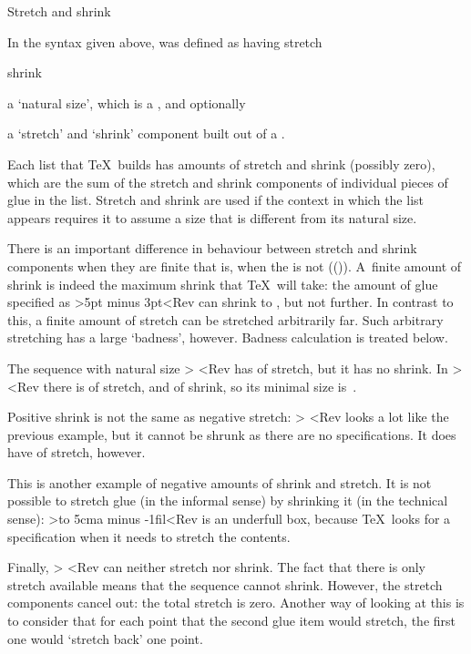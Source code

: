 \spoint Stretch and shrink

In the syntax given above,  was defined as having
\term stretch\par\term shrink\par
\itemlist\item a `natural size', which is a , and optionally
\item a `stretch' and `shrink' component built out of a .
\itemliststop

Each list that \TeX\ builds has amounts of stretch and shrink
(possibly zero),
which are the sum of the
stretch and shrink components of individual pieces of glue in the list. 
Stretch and shrink are used if the context in which the list
appears requires it to assume a size that is different from
its natural size.

There is an important difference in behaviour between stretch
and shrink components when they are finite \ldash that is,
when the  is not (()). 
A~finite amount of shrink is indeed the maximum shrink
that \TeX\ will take: the amount of glue specified
as \Ver>5pt minus 3pt<Rev can shrink to \n{2pt}, but not further.
In contrast to this, a finite amount of stretch 
can be stretched arbitrarily far. 
Such arbitrary stretching
has a large `badness', however.
Badness calculation is treated below.

\examples
The sequence with natural size \n{20pt}
\Ver> <Rev
has \n{5pt} of stretch, but it has no shrink. In
\Ver> <Rev
there is \n{3pt} of stretch, and \n{2pt} of shrink,
so its minimal size is~\n{18pt}. 

Positive shrink is not the same as negative stretch:
\Ver> <Rev
looks a lot like the previous example, but it cannot
be shrunk as there are no \hbox{}
specifications. It does have \n{1pt} of stretch, however.

This is another example of negative amounts of shrink and stretch.
It is not possible to stretch
glue (in the informal sense) by shrinking it (in the technical
sense): \Ver>\hbox to 5cm{a\hskip 0cm minus -1fil}<Rev
is an underfull box, because \TeX\ looks for a ~
specification when it needs to stretch the contents.

Finally, \Ver> <Rev
can neither stretch nor shrink.
The fact that there is only stretch
available means that the sequence cannot
shrink. However, the stretch components cancel out: the 
total stretch is zero. Another way of looking at this
is to consider that for each point that the second glue item would
stretch, the first one would `stretch back' one point.
\>

